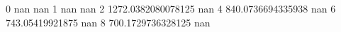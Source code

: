 0 nan nan
1 nan nan
2 1272.0382080078125 nan
4 840.0736694335938 nan
6 743.05419921875 nan
8 700.1729736328125 nan
